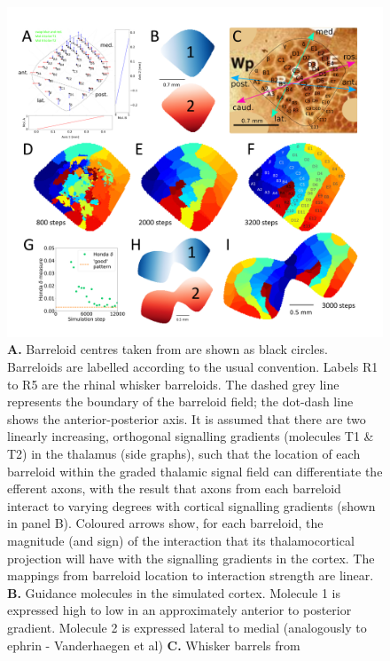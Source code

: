 \documentclass[9pt,twocolumn,twoside,lineno]{pnas-new}
\begin{document}
\begin{figure}
\begin{center}
\includegraphics[width=\textwidth]{./MainFig.png}
\end{center}
\caption{\textbf{A.} Barreloid centres taken from \cite{haidarliu_size_2001}
  are shown as black circles. Barreloids are labelled according to the usual
  convention. Labels R1 to R5 are the rhinal whisker barreloids. The dashed
  grey line represents the boundary of the barreloid field; the dot-dash line
  shows the anterior-posterior axis. It is assumed that there are two linearly
  increasing, orthogonal signalling gradients (molecules T1 \& T2) in the
  thalamus (side graphs), such that the location of each barreloid within the
  graded thalamic signal field can differentiate the efferent axons, with the
  result that axons from each barreloid interact to varying degrees with
  cortical signalling gradients (shown in panel B). Coloured arrows show, for
  each barreloid, the magnitude (and sign) of the interaction that its
  thalamocortical projection will have with the signalling gradients in the
  cortex. The mappings from barreloid location to interaction strength are
  linear. \textbf{B.} Guidance molecules in the simulated cortex. Molecule 1
  is expressed high to low in an approximately anterior to posterior
  gradient. Molecule 2 is expressed lateral to medial (analogously to ephrin -
  Vanderhaegen et al) \textbf{C.}  Whisker barrels from
}
\end{figure}
\end{document}
